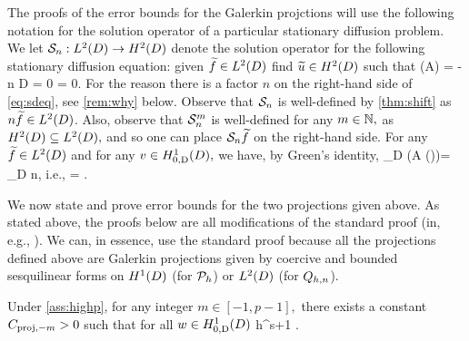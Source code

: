The proofs of the error bounds for the Galerkin projctions will use the following notation for the solution operator of a particular stationary diffusion problem. We let $\DeltaAI:\LtD\rightarrow\HtD$ denote the solution operator for the following stationary diffusion equation: given $\ftilde \in \LtD$ find $\utilde \in \HtD$ such that
\beq\label{eq:sdeq}
\grad \cdot \mleft(A\grad \utilde\mright) = -n\ftilde {} D
\eeq
\beq\label{eq:sddbc}
\trD \utilde = 0
\eeq
\beq\label{eq:sdnbc}
\dn \utilde = 0.
\eeq
For the reason there is a factor $n$ on the right-hand side of \cref{eq:sdeq}, see \cref{rem:why} below. Observe that $\mathcal S_{n}$ is well-defined by \cref{thm:shift} as $n \ftilde \in \LtD$. Also, observe that $\mathcal S_{n}^{m}$ is well-defined for any $m \in \mathbb N,$ as $\HtD \subseteq \LtD,$ and so one can place $\mathcal S_{n} \widetilde{f}$ on the right-hand side. 
For any $\ftilde \in \LtD$ and for any $v \in \HozDD,$ we have, by Green's identity,
\beqs
\int_D \mleft(A \grad \mleft(\DeltaAI\ftilde\mright)\mright)\cdot \grad \vb = \int_D n\ftilde \vb,
\eeqs
i.e.,
\beq\label{eq:deltaagreen}
 = .
\eeq




We now state and prove error bounds for the two projections given above. As stated above, the proofs below are all modifications of the standard proof (in, e.g., \cite[Theorem 5.8.3]{BrSc:08}). We can, in essence, use the standard proof because all the projections defined above are Galerkin projections given by coercive and bounded sesquilinear forms on $\HoD$ (for $\mathcal P_{h}$) or $\LtD$ (for $Q_{h,n}$).

\label{lem:ellprojerr}
Under \cref{ass:highp}, for any integer $m \in [-1,p-1],$ there exists a constant $C_{\mathrm{proj},-m} >0$ such that for all $w \in \HozDD$
\beq\label{eq:ellprojerr}
 \leq \Cmmo h^{s+1} .
\eeq
\ele
{}


